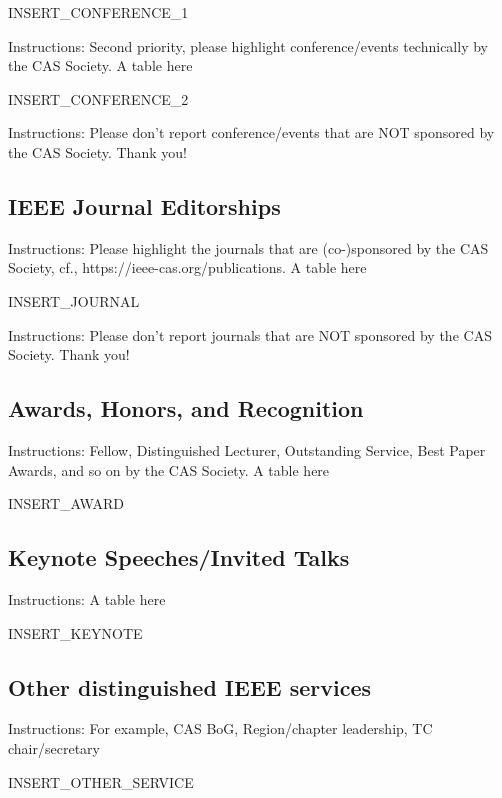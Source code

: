\documentclass{article}
\begin{document}
INSERT_CONFERENCE_1

Instructions: Second priority, please highlight conference/events technically by the CAS Society. A table here

INSERT_CONFERENCE_2

Instructions: Please don’t report conference/events that are NOT sponsored by the CAS Society.  Thank you!

\subsection{IEEE Journal Editorships}
Instructions: Please highlight the journals that are (co-)sponsored by the CAS Society, cf., https://ieee-cas.org/publications. A table here

INSERT_JOURNAL

Instructions: Please don’t report journals that are NOT sponsored by the CAS Society.  Thank you!

\subsection{Awards, Honors, and Recognition}
Instructions: Fellow, Distinguished Lecturer, Outstanding Service, Best Paper Awards, and so on by the CAS Society. A table here

INSERT_AWARD

\subsection{Keynote Speeches/Invited Talks}
Instructions: A table here

INSERT_KEYNOTE

\subsection{Other distinguished IEEE services}
Instructions: For example, CAS BoG, Region/chapter leadership, TC chair/secretary

INSERT_OTHER_SERVICE
\end{document}
